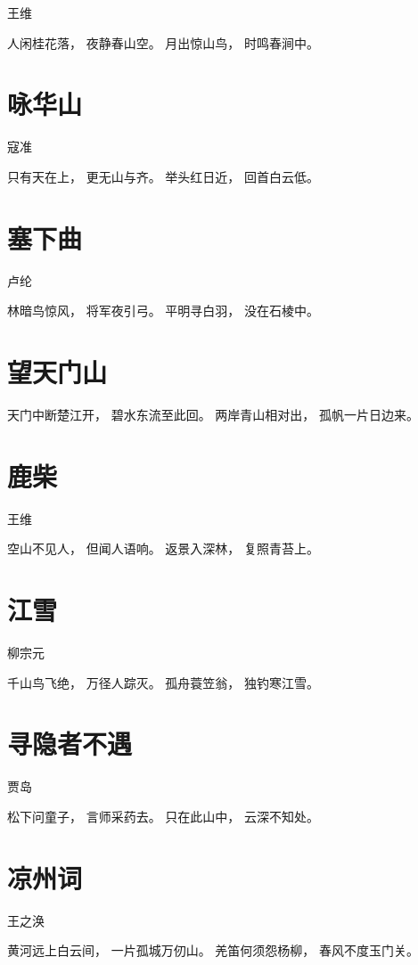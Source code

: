 \documentclass[12pt,UTF8]{ctexbook}
\begin{document}
王维

人闲桂花落，
夜静春山空。
月出惊山鸟，
时鸣春涧中。

\section{咏华山}

寇准

只有天在上，
更无山与齐。
举头红日近，
回首白云低。

\section{塞下曲}

卢纶

林暗鸟惊风，
将军夜引弓。
平明寻白羽，
没在石棱中。

\section{望天门山}

天门中断楚江开，
碧水东流至此回。
两岸青山相对出，
孤帆一片日边来。

\section{鹿柴}

王维

空山不见人，
但闻人语响。
返景入深林，
复照青苔上。

\section{江雪}

柳宗元

千山鸟飞绝，
万径人踪灭。
孤舟蓑笠翁，
独钓寒江雪。

\section{寻隐者不遇}

贾岛

松下问童子，
言师采药去。
只在此山中，
云深不知处。

\section{凉州词}

王之涣

黄河远上白云间，
一片孤城万仞山。
羌笛何须怨杨柳，
春风不度玉门关。
\end{document}

